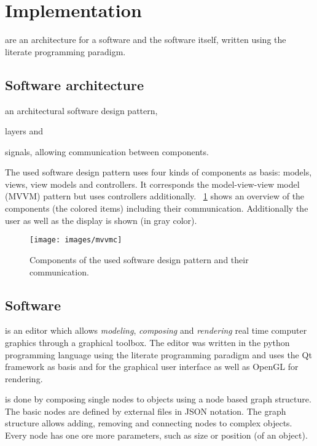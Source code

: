 
\section{Implementation}

 are an architecture for a software and
the software itself, written using the literate programming paradigm.

\subsection{Software architecture}

\begin{enumerate*}
  \item an architectural software design pattern,
  \item layers and
  \item signals, allowing communication between components.
\end{enumerate*}
The used software design pattern uses four kinds of components as basis: models,
views, view models and controllers. It corresponds the model-view-view model
(MVVM) pattern but uses controllers additionally.
~\cref{fig:software-design-pattern-components} shows an overview of the
components (the colored items) including their communication. Additionally the
user as well as the display is shown (in gray color).

\begin{figure}[ht]
  \texttt{[image: images/mvvmc]}
  \caption{Components of the used software design pattern and their communication.}
  \label{fig:software-design-pattern-components}
\end{figure}

\subsection{Software}

 is an editor which allows \textit{modeling},
\textit{composing} and \textit{rendering} real time computer graphics through a
graphical toolbox. The editor was written in the python programming language
using the literate programming paradigm and uses the Qt framework as basis and
for the graphical user interface as well as OpenGL for rendering.

 is done by composing single nodes to objects using a node
based graph structure. The basic nodes are defined by external files in JSON
notation. The graph structure allows adding, removing and connecting nodes to
complex objects. Every node has one ore more parameters, such as size or
position (of an object).

